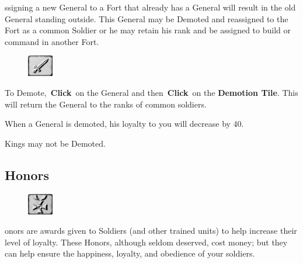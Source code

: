 
ssigning a new General to a Fort that already has a General will result in the old General standing outside. This General may be Demoted and reassigned to the Fort as a common Soldier or he may retain his rank and be assigned to build or command in another Fort.

\begin{figure}
	\vspace{-20pt}
	\begin{center}
		\includegraphics[width=0.1\textwidth]{Tsword}
	\end{center}
	\vspace{-20pt}
\end{figure}

To Demote, \textbf{Click} on the General and then \textbf{Click} on the \textbf{Demotion Tile}. This will return the General to the ranks of common soldiers.

When a General is demoted, his loyalty to you will decrease by 40.

Kings may not be Demoted.

\subsection{Honors}


\begin{figure}
	\vspace{-20pt}
	\begin{center}
		\includegraphics[width=0.1\textwidth]{Tmedal}
	\end{center}
	\vspace{-20pt}
\end{figure}

onors are awards given to Soldiers (and other trained units) to help increase their level of loyalty. These Honors, although seldom deserved, cost money; but they can help ensure the happiness, loyalty, and obedience of your soldiers.

